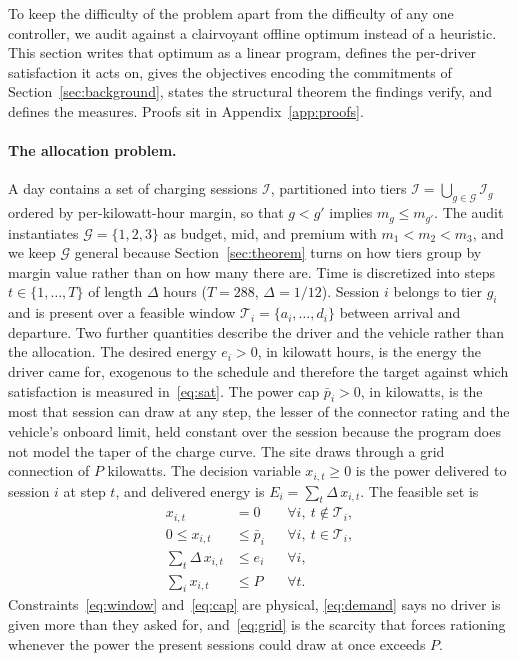 \documentclass[manuscript, screen, review, anonymous]{acmart}
\begin{document}
To keep the difficulty of the problem apart from the difficulty of any one controller, we audit against a clairvoyant offline optimum instead of a heuristic. This section writes that optimum as a linear program, defines the per-driver satisfaction it acts on, gives the objectives encoding the commitments of Section~\ref{sec:background}, states the structural theorem the findings verify, and defines the measures. Proofs sit in Appendix~\ref{app:proofs}.

\paragraph{The allocation problem.}
A day contains a set of charging sessions $\mathcal{I}$, partitioned into tiers $\mathcal{I}=\bigcup_{g\in\mathcal{G}}\mathcal{I}_g$ ordered by per-kilowatt-hour margin, so that $g<g'$ implies $m_g\le m_{g'}$. The audit instantiates $\mathcal{G}=\{1,2,3\}$ as budget, mid, and premium with $m_1<m_2<m_3$, and we keep $\mathcal{G}$ general because Section~\ref{sec:theorem} turns on how tiers group by margin value rather than on how many there are. Time is discretized into steps $t\in\{1,\dots,T\}$ of length $\Delta$ hours ($T=288$, $\Delta=1/12$). Session $i$ belongs to tier $g_i$ and is present over a feasible window $\mathcal{T}_i=\{a_i,\dots,d_i\}$ between arrival and departure. Two further quantities describe the driver and the vehicle rather than the allocation. The desired energy $e_i>0$, in kilowatt hours, is the energy the driver came for, exogenous to the schedule and therefore the target against which satisfaction is measured in~\eqref{eq:sat}. The power cap $\bar p_i>0$, in kilowatts, is the most that session can draw at any step, the lesser of the connector rating and the vehicle's onboard limit, held constant over the session because the program does not model the taper of the charge curve. The site draws through a grid connection of $P$ kilowatts. The decision variable $x_{i,t}\ge 0$ is the power delivered to session $i$ at step $t$, and delivered energy is $E_i=\sum_t \Delta\, x_{i,t}$. The feasible set is
\begin{align}
x_{i,t}&=0 & &\forall i,\ t\notin\mathcal{T}_i, \label{eq:window}\\
0\le x_{i,t}&\le \bar p_i & &\forall i,\ t\in\mathcal{T}_i, \label{eq:cap}\\
\textstyle\sum_t \Delta\, x_{i,t}&\le e_i & &\forall i, \label{eq:demand}\\
\textstyle\sum_i x_{i,t}&\le P & &\forall t. \label{eq:grid}
\end{align}
Constraints~\eqref{eq:window} and~\eqref{eq:cap} are physical, \eqref{eq:demand} says no driver is given more than they asked for, and~\eqref{eq:grid} is the scarcity that forces rationing whenever the power the present sessions could draw at once exceeds $P$.
\end{document}
